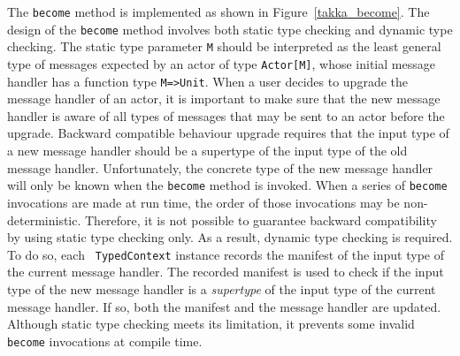 The {\tt become} method is implemented as shown in Figure~\ref{takka_become}.  
The design of the {\tt become} method involves both static type checking 
and dynamic type checking.  The static type parameter {\tt M} should be 
interpreted as the least general type of messages expected by an actor 
of type {\tt Actor[M]}, whose initial message handler has a function type {\tt M=>Unit}.
When a user decides to upgrade the message handler of an actor, it is
important to make sure that the new message handler is aware of all
types of messages that may be sent to an actor before the
upgrade.  Backward compatible behaviour upgrade requires that the input type of a 
new message handler should be a supertype of the input type of the old message 
handler.  Unfortunately, the concrete type of the new message handler will only 
be known when the {\tt become} method is invoked. When a series of {\tt become} 
invocations are made at run time, the order of those invocations may be 
non-deterministic.  Therefore, it is not possible to guarantee backward 
compatibility by using static type checking only.
As a result, dynamic type checking is required.  To do so, each {\tt 
TypedContext} instance records the manifest of the input 
type of the current message handler.  The recorded manifest is used to check if 
the input type of the new message handler is a {\it supertype} of the 
input type of the current message handler.  If so, both the manifest and the 
message handler are updated.  Although static type checking meets its 
limitation, it prevents some invalid {\tt become} invocations at compile time.

